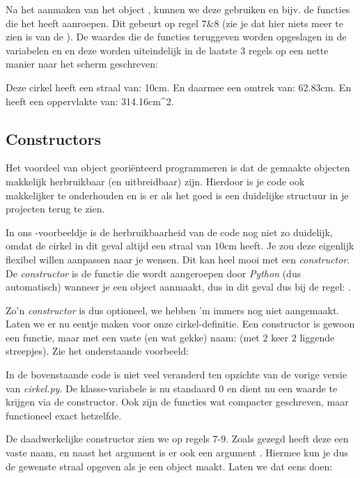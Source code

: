 Na het aanmaken van het object , kunnen we deze gebruiken en bijv. de functies die het heeft aanroepen. Dit gebeurt op regel $7 \& 8$ (zie je dat hier niets meer te zien is van de ). De waardes die de functies teruggeven worden opgeslagen in de variabelen  en  en deze worden uiteindelijk in de laatste $3$ regels op een nette manier naar het scherm geschreven:  

\begin{python}
Deze cirkel heeft een straal van: 10cm.
En daarmee een omtrek van: 62.83cm.
En heeft een oppervlakte van: 314.16cm^2.
\end{python}

\newpage

\subsection{Constructors}
Het voordeel van object georiënteerd programmeren is dat de gemaakte objecten makkelijk herbruikbaar (en uitbreidbaar) zijn. Hierdoor is je code ook makkelijker te onderhouden en is er als het goed is een duidelijke structuur in je projecten terug te zien. 

In ons -voorbeeldje is de herbruikbaarheid van de code nog niet zo duidelijk, omdat de cirkel in dit geval altijd een straal van $10$cm heeft. Je zou deze eigenlijk flexibel willen aanpassen naar je wensen. Dit kan heel mooi met een \textit{constructor}. De \textit{constructor} is de functie die wordt aangeroepen door \textit{Python} (dus automatisch) wanneer je een object aanmaakt, dus in dit geval dus bij de regel:  .  

Zo'n \textit{constructor} is dus optioneel, we hebben 'm immers nog niet aangemaakt. Laten we er nu eentje maken voor onze cirkel-definitie. Een constructor is gewoon een functie, maar met een vaste (en wat gekke) naam:  (met $2$ keer $2$ liggende streepjes). Zie het onderstaande voorbeeld:


In de bovenstaande code is niet veel veranderd ten opzichte van de vorige versie van \textit{cirkel.py}. De klasse-variabele  is nu standaard $0$ en dient nu een waarde te krijgen via de constructor. Ook zijn de functies wat compacter geschreven, maar functioneel exact hetzelfde. 

De daadwerkelijke constructor zien we op regels $7$-$9$. Zoals gezegd heeft deze een vaste naam, en naast het argument  is er ook een argument . Hiermee kun je dus de gewenste straal opgeven als je een object maakt. Laten we dat eens doen:

